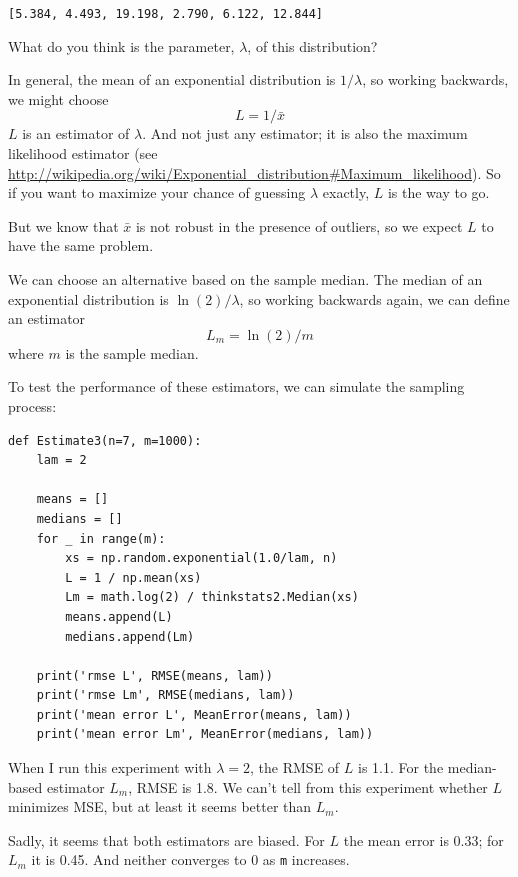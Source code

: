 \documentclass[12pt]{book}
\newcommand{\xbar}{\bar{x}}
\newcommand{\lamhat}{L}
\newcommand{\lamhatmed}{L_m}
\theoremstyle{exercise}
\begin{document}
{\tt [5.384, 4.493, 19.198, 2.790, 6.122, 12.844]}

What do you think is the parameter, $\lambda$, of this distribution?%
%

In general, the mean of an exponential distribution is $1/\lambda$,
so working backwards, we might choose
%
\[ \lamhat = 1 / \xbar\]
%
$\lamhat$ is an
estimator of $\lambda$.  And not just any estimator; it is also the
maximum likelihood estimator (see
\url{http://wikipedia.org/wiki/Exponential_distribution#Maximum_likelihood}).
So if you want to maximize your chance of guessing $\lambda$ exactly,
$\lamhat$ is the way to go.%
%

But we know that $\xbar$ is not robust in the presence of outliers, so
we expect $\lamhat$ to have the same problem.%
%
%

We can choose an alternative based on the sample median.
The median of an exponential distribution is $\ln(2) / \lambda$,
so working backwards again, we can define an estimator
%
\[ \lamhatmed = \ln(2) / m \]
%
where $m$ is the sample median.%

To test the performance of these estimators, we can simulate the
sampling process:

\begin{verbatim}
def Estimate3(n=7, m=1000):
    lam = 2

    means = []
    medians = []
    for _ in range(m):
        xs = np.random.exponential(1.0/lam, n)
        L = 1 / np.mean(xs)
        Lm = math.log(2) / thinkstats2.Median(xs)
        means.append(L)
        medians.append(Lm)

    print('rmse L', RMSE(means, lam))
    print('rmse Lm', RMSE(medians, lam))
    print('mean error L', MeanError(means, lam))
    print('mean error Lm', MeanError(medians, lam))
\end{verbatim}

When I run this experiment with $\lambda=2$, the RMSE of $L$ is
1.1.  For the median-based estimator $L_m$, RMSE is 1.8.  We can't
tell from this experiment whether $L$ minimizes MSE, but at least
it seems better than $L_m$.%
%

Sadly, it seems that both estimators are biased.  For $L$ the mean
error is 0.33; for $L_m$ it is 0.45.  And neither converges to 0
as {\tt m} increases.%
%
\end{document}
